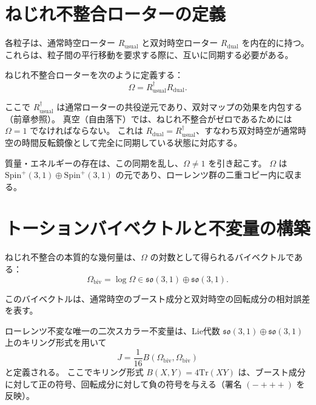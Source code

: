 \documentclass[dvipdfmx,a4paper]{jsbook}
\theoremstyle{definition}
\theoremstyle{remark}
\begin{document}
\section{ねじれ不整合ローターの定義}
\label{sec:torsional-mismatch-rotor}

各粒子は、通常時空ローター $R_\text{usual}$ と双対時空ローター $R_\text{dual}$ を内在的に持つ。  
これらは、粒子間の平行移動を要求する際に、互いに同期する必要がある。  

ねじれ不整合ローターを次のように定義する：
\begin{equation}
  \Omega = R_\text{usual}^\dagger R_\text{dual}.
  \label{eq:omega-definition}
\end{equation}

ここで $R_\text{usual}^\dagger$ は通常ローターの共役逆元であり、双対マップの効果を内包する（前章参照）。  
真空（自由落下）では、ねじれ不整合がゼロであるためには $\Omega = 1$ でなければならない。  
これは $R_\text{dual} = R_\text{usual}^\dagger$、すなわち双対時空が通常時空の時間反転鏡像として完全に同期している状態に対応する。  

質量・エネルギーの存在は、この同期を乱し、$\Omega \neq 1$ を引き起こす。  
$\Omega$ は $\mathrm{Spin}^+(3,1) \oplus \mathrm{Spin}^+(3,1)$ の元であり、ローレンツ群の二重コピー内に収まる。

\section{トーションバイベクトルと不変量の構築}
\label{sec:torsion-bivector-J}

ねじれ不整合の本質的な幾何量は、$\Omega$ の対数として得られるバイベクトルである：
\begin{equation}
  \Omega_\text{biv} = \log \Omega \in \mathfrak{so}(3,1) \oplus \mathfrak{so}(3,1).
\end{equation}

このバイベクトルは、通常時空のブースト成分と双対時空の回転成分の相対誤差を表す。  

ローレンツ不変な唯一の二次スカラー不変量は、Lie代数 $\mathfrak{so}(3,1) \oplus \mathfrak{so}(3,1)$ 上のキリング形式を用いて
\begin{equation}
  J = \frac{1}{16} B(\Omega_\text{biv}, \Omega_\text{biv})
  \label{eq:J-definition}
\end{equation}
と定義される。  
ここでキリング形式 $B(X,Y) = 4 \mathrm{Tr}(X Y)$ は、ブースト成分に対して正の符号、回転成分に対して負の符号を与える（署名 $(-+++)$ を反映）。  
\end{document}
